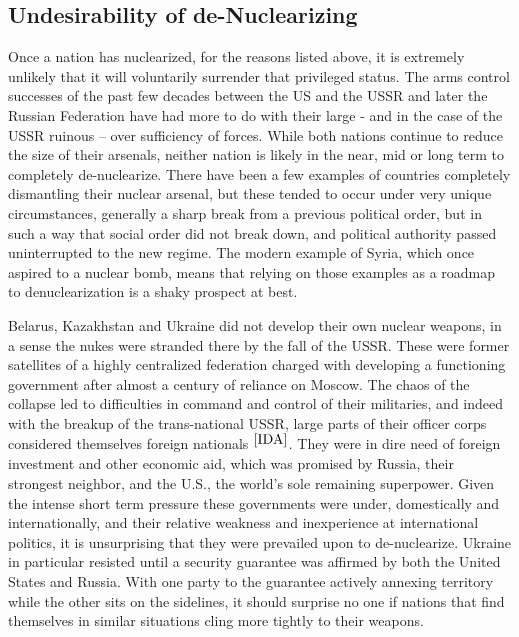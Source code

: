 \documentclass[journal]{IEEEtran}
\begin{document}
\subsection{Undesirability of de-Nuclearizing}
Once a nation has nuclearized, for the reasons listed above, it is extremely unlikely that it will voluntarily surrender that privileged status.  The arms control successes of the past few decades between the US and the USSR and later the Russian Federation have had more to do with their large - and in the case of the USSR ruinous – over sufficiency of forces.  While both nations continue to reduce the size of their arsenals, neither nation is likely in the near, mid or long term to completely de-nuclearize.  There have been a few examples of countries completely dismantling their nuclear arsenal, but these tended to occur under very unique circumstances, generally a sharp break from a previous political order, but in such a way that social order did not break down, and political authority passed uninterrupted to the new regime.  The modern example of Syria, which once aspired to a nuclear bomb, means that relying on those examples as a roadmap to denuclearization is a shaky prospect at best.\par
Belarus, Kazakhstan and Ukraine did not develop their own nuclear weapons, in a sense the nukes were stranded there by the fall of the USSR.  These were former satellites of a highly centralized federation charged with developing a functioning government after almost a century of reliance on Moscow.  The chaos of the collapse led to difficulties in command and control of their militaries, and indeed with the breakup of the trans-national USSR, large parts of their officer corps considered themselves foreign nationals $^{\cite{IDA}}$.  They were in dire need of foreign investment and other economic aid, which was promised by Russia, their strongest neighbor, and the U.S., the world's sole remaining superpower.  Given the intense short term pressure these governments were under, domestically and internationally, and their relative weakness and inexperience at international politics, it is unsurprising that they were prevailed upon to de-nuclearize.  Ukraine in particular resisted until a security guarantee was affirmed by both the United States and Russia.  With one party to the guarantee actively annexing territory while the other sits on the sidelines, it should surprise no one if nations that find themselves in similar situations cling more tightly to their weapons.\par
\end{document}
